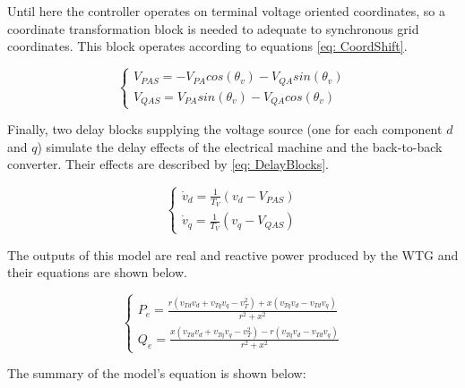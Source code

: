 Until here the controller operates on terminal voltage oriented coordinates, so a coordinate transformation block is needed to adequate to synchronous grid coordinates. This block operates according to equations \eqref{eq: CoordShift}.

\begin{equation}
	\begin{cases}
		V_{PAS} = -V_{PA}cos(\theta_{v}) - V_{QA}sin(\theta_{v}) \\
		V_{QAS} = V_{PA}sin(\theta_{v}) - V_{QA}cos(\theta_{v})
	\end{cases}
	\label{eq: CoordShift}
\end{equation}

Finally, two delay blocks supplying the voltage source (one for each component $d$ and $q$) simulate the delay effects of the electrical machine and the back-to-back converter. Their effects are described by \eqref{eq: DelayBlocks}.

\begin{equation}
	\begin{cases}
		\dot{v}_{d} = \frac{1}{T_{V}}(v_{d} - V_{PAS}) \\
		\dot{v}_{q} = \frac{1}{T_{V}}(v_{q} - V_{QAS})
	\end{cases}
	\label{eq: DelayBlocks}
\end{equation}

The outputs of this model are real and reactive power produced by the WTG and their equations are shown below.

\begin{equation}
	\begin{cases}
		P_{e} = \frac{r(v_{Td}v_{d} + v_{Tq}v_{q} - v_{T}^{2}) + x(v_{Tq}v_{d} - v_{Td}v_{q})}{r^{2} + x^{2}} \\
		Q_{e} = \frac{x(v_{Td}v_{d} + v_{Tq}v_{q} - v_{T}^{2}) - r(v_{Tq}v_{d} - v_{Td}v_{q})}{r^{2} + x^{2}}
	\end{cases}
	\label{eq: Outputs}
\end{equation}

The summary of the model's equation is shown below:


